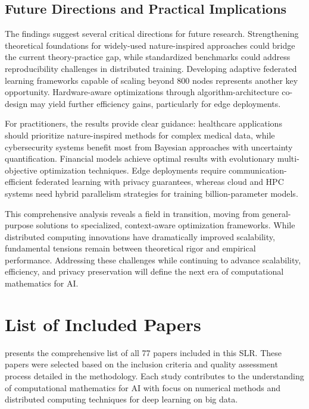 \documentclass[acmsmall]{acmart}
\begin{document}
\subsection{Future Directions and Practical Implications}
The findings suggest several critical directions for future research. Strengthening theoretical foundations for widely-used nature-inspired approaches could bridge the current theory-practice gap, while standardized benchmarks could address reproducibility challenges in distributed training. Developing adaptive federated learning frameworks capable of scaling beyond 800 nodes represents another key opportunity. Hardware-aware optimizations through algorithm-architecture co-design may yield further efficiency gains, particularly for edge deployments.

For practitioners, the results provide clear guidance: healthcare applications should prioritize nature-inspired methods for complex medical data, while cybersecurity systems benefit most from Bayesian approaches with uncertainty quantification. Financial models achieve optimal results with evolutionary multi-objective optimization techniques. Edge deployments require communication-efficient federated learning with privacy guarantees, whereas cloud and HPC systems need hybrid parallelism strategies for training billion-parameter models.

This comprehensive analysis reveals a field in transition, moving from general-purpose solutions to specialized, context-aware optimization frameworks. While distributed computing innovations have dramatically improved scalability, fundamental tensions remain between theoretical rigor and empirical performance. Addressing these challenges while continuing to advance scalability, efficiency, and privacy preservation will define the next era of computational mathematics for AI.

\appendix
\section{List of Included Papers}\label{app:list-of-included-papers}
 presents the comprehensive list of all 77 papers included in this SLR. These papers were selected based on the inclusion criteria and quality assessment process detailed in the methodology. Each study contributes to the understanding of computational mathematics for AI with focus on numerical methods and distributed computing techniques for deep learning on big data.





\end{document}
